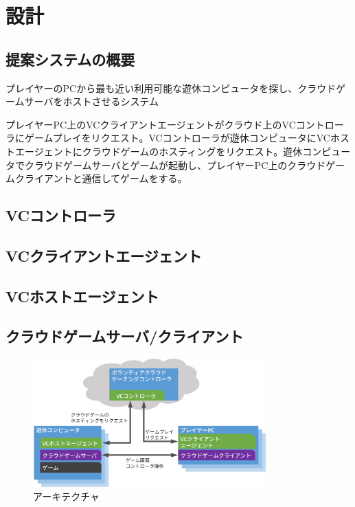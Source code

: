 \section{設計}

\subsection{提案システムの概要}
プレイヤーのPCから最も近い利用可能な遊休コンピュータを探し、クラウドゲームサーバをホストさせるシステム

プレイヤーPC上のVCクライアントエージェントがクラウド上のVCコントローラにゲームプレイをリクエスト。VCコントローラが遊休コンピュータにVCホストエージェントにクラウドゲームのホスティングをリクエスト。遊休コンピュータでクラウドゲームサーバとゲームが起動し、プレイヤーPC上のクラウドゲームクライアントと通信してゲームをする。

\subsection{VCコントローラ}

\subsection{VCクライアントエージェント}

\subsection{VCホストエージェント}

\subsection{クラウドゲームサーバ/クライアント}

\begin{figure}[t]
    \centering
    \includegraphics[width=0.8\textwidth,keepaspectratio,clip]{img/architecture.eps}
    \caption{アーキテクチャ}
    \label{fig:arch}
\end{figure}

